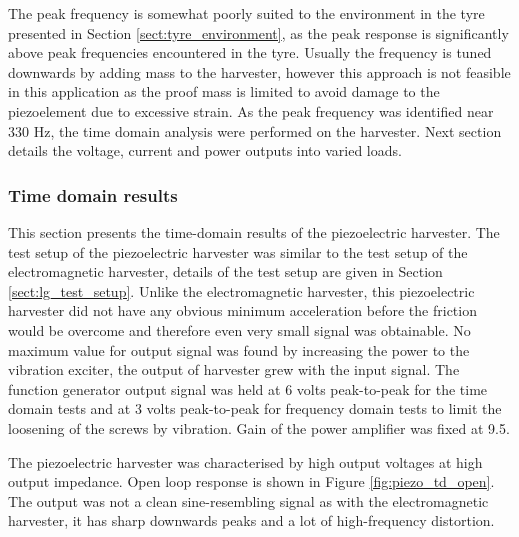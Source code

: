 The peak frequency is somewhat poorly suited to the environment in the tyre presented in Section \ref{sect:tyre_environment}, as the peak response is significantly above peak frequencies encountered in the tyre. Usually the frequency is tuned downwards by adding mass to the harvester, however this approach is not feasible in this application as the proof mass is limited to avoid damage to the piezoelement due to excessive strain. As the peak frequency was identified near 330 Hz, the time domain analysis were performed on the harvester. Next section details the voltage, current and power outputs into varied loads.

\subsubsection{Time domain results}\label{sect:piezo_td}
This section presents the time-domain results of the piezoelectric harvester. The test setup of the piezoelectric harvester was similar to the test setup of the electromagnetic harvester, details of the test setup are given in Section \ref{sect:lg_test_setup}. Unlike the electromagnetic harvester, this piezoelectric harvester did not have any obvious minimum acceleration before the friction would be overcome and therefore even very small signal was obtainable. No maximum value for output signal was found by increasing the power to the vibration exciter, the output of harvester grew with the input signal. The function generator output signal was held at 6 volts peak-to-peak for the time domain tests and at 3 volts peak-to-peak for frequency domain tests to limit the loosening of the screws by vibration. Gain of the power amplifier was fixed at 9.5.

The piezoelectric harvester was characterised by high output voltages at high output impedance. Open loop response is shown in Figure \ref{fig:piezo_td_open}. The output was not a clean sine-resembling signal as with the electromagnetic harvester, it has sharp downwards peaks and a lot of high-frequency distortion.

